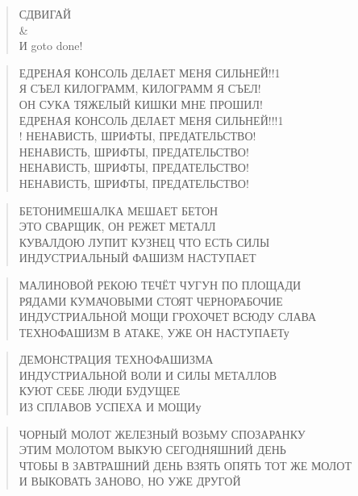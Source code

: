 
\poemtitle{***}
\begin{verse}
СДВИГАЙ\\
\&\\
И goto done!
\end{verse}

\poemtitle{***}
\begin{verse}
ЕДРЕНАЯ КОНСОЛЬ ДЕЛАЕТ МЕНЯ СИЛЬНЕЙ!!1\\
Я СЪЕЛ КИЛОГРАММ, КИЛОГРАММ Я СЪЕЛ!\\
ОН СУКА ТЯЖЕЛЫЙ КИШКИ МНЕ ПРОШИЛ!\\
ЕДРЕНАЯ КОНСОЛЬ ДЕЛАЕТ МЕНЯ СИЛЬНЕЙ!!!1\\!
НЕНАВИСТЬ, ШРИФТЫ, ПРЕДАТЕЛЬСТВО!\\
НЕНАВИСТЬ, ШРИФТЫ, ПРЕДАТЕЛЬСТВО!\\
НЕНАВИСТЬ, ШРИФТЫ, ПРЕДАТЕЛЬСТВО!\\
НЕНАВИСТЬ, ШРИФТЫ, ПРЕДАТЕЛЬСТВО!
\end{verse}

\poemtitle{***}
\begin{verse}
БЕТОНИМЕШАЛКА МЕШАЕТ БЕТОН\\
ЭТО СВАРЩИК, ОН РЕЖЕТ МЕТАЛЛ\\
КУВАЛДОЮ ЛУПИТ КУЗНЕЦ ЧТО ЕСТЬ СИЛЫ\\
ИНДУСТРИАЛЬНЫЙ ФАШИЗМ НАСТУПАЕТ
\end{verse}

\poemtitle{***}
\begin{verse}
МАЛИНОВОЙ РЕКОЮ ТЕЧЁТ ЧУГУН ПО ПЛОЩАДИ\\
РЯДАМИ КУМАЧОВЫМИ СТОЯТ ЧЕРНОРАБОЧИЕ\\
ИНДУСТРИАЛЬНОЙ МОЩИ ГРОХОЧЕТ ВСЮДУ СЛАВА\\
ТЕХНОФАШИЗМ В АТАКЕ, УЖЕ ОН НАСТУПАЕТу
\end{verse}

\poemtitle{***}
\begin{verse}
ДЕМОНСТРАЦИЯ ТЕХНОФАШИЗМА\\
ИНДУСТРИАЛЬНОЙ ВОЛИ И СИЛЫ МЕТАЛЛОВ\\
КУЮТ СЕБЕ ЛЮДИ БУДУЩЕЕ\\
ИЗ СПЛАВОВ УСПЕХА И МОЩИу
\end{verse}

\poemtitle{***}
\begin{verse}
ЧОРНЫЙ МОЛОТ ЖЕЛЕЗНЫЙ ВОЗЬМУ СПОЗАРАНКУ\\
ЭТИМ МОЛОТОМ ВЫКУЮ СЕГОДНЯШНИЙ ДЕНЬ\\
ЧТОБЫ В ЗАВТРАШНИЙ ДЕНЬ ВЗЯТЬ ОПЯТЬ ТОТ ЖЕ МОЛОТ\\
И ВЫКОВАТЬ ЗАНОВО, НО УЖЕ ДРУГОЙ
\end{verse}

